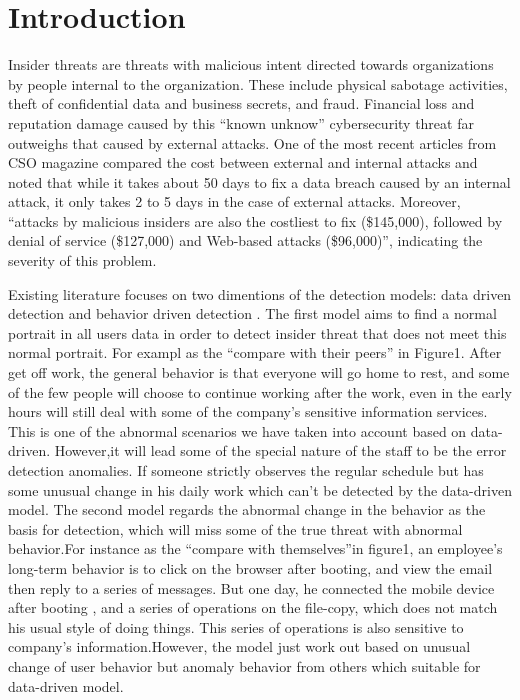 \documentclass[conference]{IEEEtran}
\begin{document}
\section{Introduction}

Insider threats are threats with malicious intent directed towards organizations by people internal to the organization.
These include physical sabotage activities, theft of confidential data and business secrets, and fraud. Financial loss and reputation damage caused by this ``known unknow'' cybersecurity threat far outweighs that caused by external attacks. One of the most recent articles from CSO magazine\cite{b3} compared the cost between external and internal attacks and noted that while it takes about 50 days to fix a data breach caused by an internal attack, it only takes 2 to 5 days in the case of external attacks. Moreover, “attacks by malicious insiders are also the costliest to fix (\$145,000), followed by denial of service (\$127,000) and Web-based attacks (\$96,000)”, indicating the severity of this problem.

Existing literature focuses on two dimentions of the detection 
models: data driven detection \cite{b9} and behavior driven detection
. 
The first model aims to find a normal portrait in all users data in order to detect insider threat that does not meet this normal portrait. For exampl as the ``compare with their peers'' in Figure1. 
After get off work, the general behavior is that everyone will go home to rest, and some of the few people will choose to continue working after the work, even in the early hours will still deal with some of the company's sensitive information services. This is one of the abnormal scenarios we have taken into account based on data-driven. However,it will lead some of the special nature of the staff to be the error detection anomalies. If someone strictly observes the regular schedule but has some unusual change in his daily work which can't be detected by the data-driven model.
The second model regards the abnormal change in the behavior as the basis for detection, which will miss some of the true threat with abnormal behavior.For instance as the ``compare with themselves''in figure1, an employee's long-term behavior is to click on the browser after booting, and view the email then reply to a series of messages. But one day, he connected the mobile device after booting , and a series of operations on the file-copy, which does not match his usual style of doing things. This series of operations is also sensitive to company's information.However, the model just work out based on unusual change of user behavior but anomaly behavior from others which suitable for data-driven model.
\end{document}
